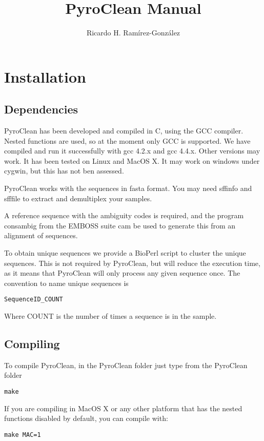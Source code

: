 \documentclass[12pt]{article}
\title{PyroClean Manual}
\author{Ricardo H. Ramírez-González}
\begin{document}
\maketitle



\section{Installation}

\subsection{Dependencies}

PyroClean has been developed and compiled in C, using the GCC compiler. Nested functions are used, so at the moment only GCC is supported. We have compiled and run it successfully with gcc 4.2.x and gcc 4.4.x. Other versions may work. It has been tested on Linux and MacOS X. It may work on windows under cygwin, but this has not ben assessed. 

PyroClean works with the sequences in fasta format. You may need sffinfo and sfffile to extract and demultiplex your samples. 

A reference sequence with the ambiguity codes is required, and the program consambig from the EMBOSS suite cam be used to generate this from an alignment of sequences.  

To obtain unique sequences we provide a BioPerl script to cluster the unique sequences. This is not  required by PyroClean, but will reduce the execution time, as it means that PyroClean will only process any given sequence once. The convention to name unique sequences is
\begin{verbatim}
SequenceID_COUNT
\end{verbatim}
Where COUNT is the number of times a sequence is in the sample. 

\subsection{Compiling}

To compile PyroClean, in the PyroClean folder just type from the PyroClean folder

\begin{verbatim}
make
\end{verbatim}

If you are compiling in MacOS X or any other platform that has the nested functions disabled by default, you can compile with:
\begin{verbatim}
make MAC=1
\end{verbatim}
\end{document}
